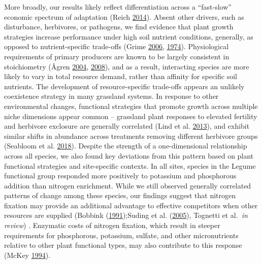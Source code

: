 \documentclass[twoside,12pt,final]{ucthesis-CA2012}
\begin{document}
\begin{ucmainmatter}
More broadly, our results likely reflect differentiation across a ``fast-slow'' economic spectrum of adaptation (Reich \protect\hyperlink{ref-Reich2014}{2014}). Absent other drivers, such as disturbance, herbivores, or pathogens, we find evidence that plant growth strategies increase performance under high soil nutrient conditions, generally, as opposed to nutrient-specific trade-offs (Grime \protect\hyperlink{ref-Grime2006}{2006}, \protect\hyperlink{ref-Grime1974}{1974}). Physiological requirements of primary producers are known to be largely consistent in stoichiometry (Ågren \protect\hyperlink{ref-Agren2004}{2004}, \protect\hyperlink{ref-Agren2008}{2008}), and as a result, interacting species are more likely to vary in total resource demand, rather than affinity for specific soil nutrients. The development of resource-specific trade-offs appears an unlikely coexistence strategy in many grassland systems. In response to other environmental changes, functional strategies that promote growth across multiple niche dimensions appear common -- grassland plant responses to elevated fertility and herbivore exclosure are generally correlated (Lind et al. \protect\hyperlink{ref-Lind2013}{2013}), and exhibit similar shifts in abundance across treatments removing different herbivore groups (Seabloom et al. \protect\hyperlink{ref-Seabloom2018}{2018}).
Despite the strength of a one-dimensional relationship across all species, we also found key deviations from this pattern based on plant functional strategies and site-specific contexts. In all sites, species in the Legume functional group responded more positively to potassium and phosphorous addition than nitrogen enrichment. While we still observed generally correlated patterns of change among these species, our findings suggest that nitrogen fixation may provide an additional advantage to effective competitors when other resources are supplied (Bobbink (\protect\hyperlink{ref-Bobbink1991}{1991});Suding et al. (\protect\hyperlink{ref-Suding2005}{2005}), Tognetti et al.~\emph{in review}) . Enzymatic costs of nitrogen fixation, which result in steeper requirements for phosphorous, potassium, sulfate, and other micronutrients relative to other plant functional types, may also contribute to this response (McKey \protect\hyperlink{ref-McKey1994}{1994}).


\end{ucmainmatter}
\end{document}
